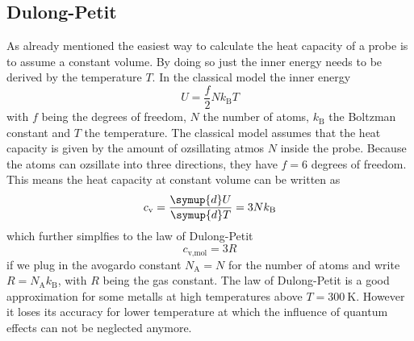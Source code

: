 \subsection{Dulong-Petit}
As already mentioned the easiest way to calculate the heat capacity of a probe is to assume a constant volume.
By doing so just the inner energy needs to be derived by the temperature $T$.
In the classical model the inner energy
\begin{equation*}
    U = \frac{f}{2}Nk_\text{B}T
\end{equation*}
with $f$ being the degrees of freedom, $N$ the number of atoms, $k_\text{B}$ the Boltzman constant and $T$ the temperature.
The classical model assumes that the heat capacity is given by the amount of ozsillating atmos $N$ inside the probe.
Because the atoms can ozsillate into three directions, they have $f=6$ degrees of freedom.
This means the heat capacity at constant volume can be written as 
\begin{equation*}
    c_\text{v} = \frac{\symup{d}U}{\symup{d}T} = 3Nk_\text{B}
\end{equation*}
which further simplfies to the law of Dulong-Petit
\begin{equation}
    c_\text{v,mol} = 3R
    \label{eq:dulong}
\end{equation}
if we plug in the avogardo constant $N_\text{A} = N$ for the number of atoms and write $R = N_\text{A} k_\text{B}$, with $R$ being the gas constant.
The law of Dulong-Petit is a good approximation for some metalls at high temperatures above $T = \SI{300}{\K}$.
However it loses its accuracy for lower temperature at which the influence of quantum effects can not be neglected anymore.
